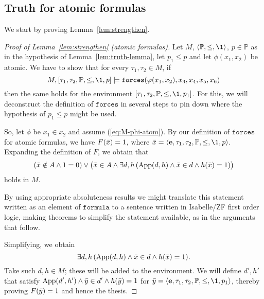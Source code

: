 \documentclass[11pt,english]{article}
\renewcommand{\PP}{\mathbb{P}}
\renewcommand{\app}{\mathrm{App}}
\newcommand{\formula}{\ensuremath{\mathtt{formula}}}
\newcommand{\forceisa}{\mathtt{forces}}
\newcommand{\equ}{\mathbf{e}}
\begin{document}
\subsection{Truth for atomic formulas}
We start by proving  Lemma~\ref{lem:strengthen}.%
\begin{proof}[Proof of  Lemma~\ref{lem:strengthen} (atomic formulas)]
  Let $M$, $\lb\PP,\leq,\1\rb$, $p\in\PP$ as in the hypothesis of
  Lemma~\ref{lem:truth-lemma}, let $p_1\leq p$ and let $\phi(x_1,x_2)$
  be atomic. We 
  have to show that for every    $\tau_1,\tau_2\in M$, if
  \begin{equation} \label{eq:M-phi-atom}
    M,[\tau_1,\tau_2,\PP,\leq,\1,p] 
    \models\forceisa(\phi(x_1,x_2),x_{3},x_{4},x_{5},x_{6})
  \end{equation}
  then the same holds for the environment
  $[\tau_1,\tau_2,\PP,\leq,\1,p_1]$. For this, we will deconstruct the
  definition of $\forceisa$ in several steps to pin down where the
  hypothesis of $p_1\leq p$ might be used.
  
  So, let $\phi$ be $x_1\in x_2$ and assume (\ref{eq:M-phi-atom}). By
  our definition of $\forceisa$  for atomic formulas, we have
  $F(\bar{x})=1$, where
  $\bx=\lb\equ,\tau_1,\tau_2,\PP,\leq,\1,p\rb$. Expanding the
  definition of $F$, we obtain that
  \[
  (\bx\notin A \y 1=0) \o \bigl(\bx\in A \y \exists d,h\, (\app(d,h)\y
  \bx\in d \y h(\bx)=1)\bigr)
  \]
  holds in $M$. 
  \begin{framed}
    By using appropriate absoluteness results we might translate this
    statement written as an element of $\formula$ to a sentence
    written in Isabelle/ZF first order logic, making theorems to
    simplify the statement available, as in the arguments
    that follow.
  \end{framed}
  \noindent Simplifying, we obtain 
  \begin{equation}\label{eq:1}
    \exists d,h\, (\app(d,h)\y   \bx\in d \y h(\bx)=1).
  \end{equation}
  Take such $d,h\in M$; these will be added to the environment. We
  will define $d',h'$ that satisfy 
  $\app(d',h')\y   \by\in d' \y h(\by)=1$ for
  $\by=\lb\equ,\tau_1,\tau_2,\PP,\leq,\1,p_1\rb$, thereby proving
  $F(\bar{y})=1$ and hence the thesis.


\end{proof}
\end{document}
